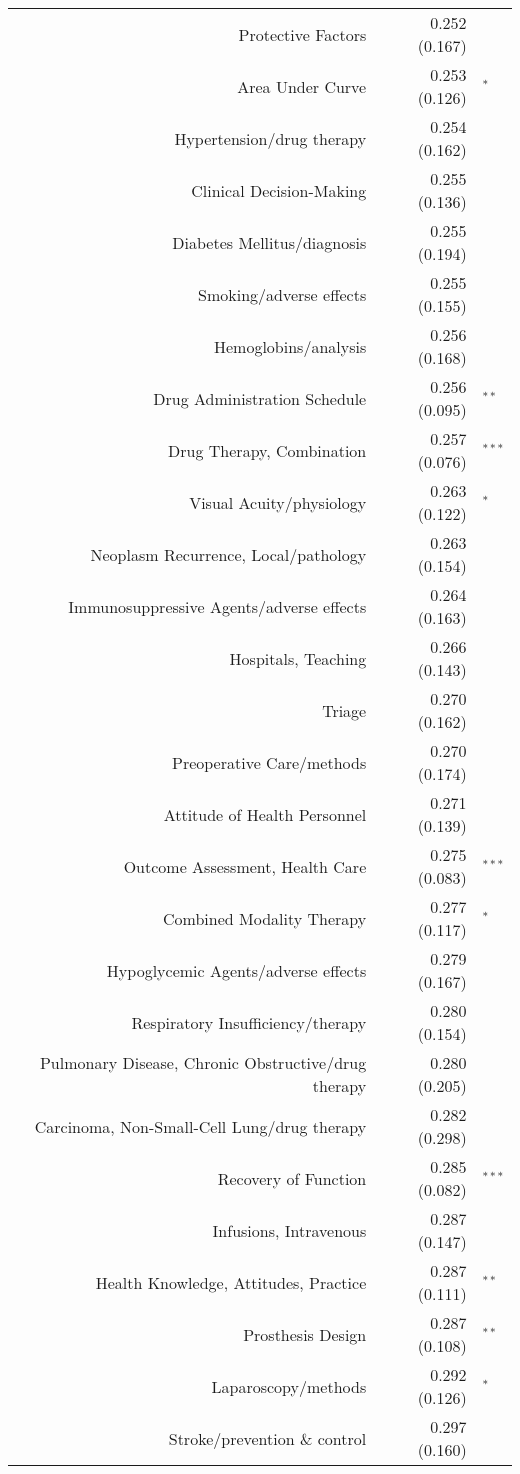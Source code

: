 \begin{longtable}[l]{rr@{}l@{ }}
Protective Factors & 0.252 (0.167) & $^{}$\\
Area Under Curve & 0.253 (0.126) & $^{*}$\\
Hypertension/drug therapy & 0.254 (0.162) & $^{}$\\
Clinical Decision-Making & 0.255 (0.136) & $^{}$\\
Diabetes Mellitus/diagnosis & 0.255 (0.194) & $^{}$\\
Smoking/adverse effects & 0.255 (0.155) & $^{}$\\
Hemoglobins/analysis & 0.256 (0.168) & $^{}$\\
Drug Administration Schedule & 0.256 (0.095) & $^{**}$\\
Drug Therapy, Combination & 0.257 (0.076) & $^{***}$\\
Visual Acuity/physiology & 0.263 (0.122) & $^{*}$\\
Neoplasm Recurrence, Local/pathology & 0.263 (0.154) & $^{}$\\
Immunosuppressive Agents/adverse effects & 0.264 (0.163) & $^{}$\\
Hospitals, Teaching & 0.266 (0.143) & $^{}$\\
Triage & 0.270 (0.162) & $^{}$\\
Preoperative Care/methods & 0.270 (0.174) & $^{}$\\
Attitude of Health Personnel & 0.271 (0.139) & $^{}$\\
Outcome Assessment, Health Care & 0.275 (0.083) & $^{***}$\\
Combined Modality Therapy & 0.277 (0.117) & $^{*}$\\
Hypoglycemic Agents/adverse effects & 0.279 (0.167) & $^{}$\\
Respiratory Insufficiency/therapy & 0.280 (0.154) & $^{}$\\
Pulmonary Disease, Chronic Obstructive/drug therapy & 0.280 (0.205) & $^{}$\\
Carcinoma, Non-Small-Cell Lung/drug therapy & 0.282 (0.298) & $^{}$\\
Recovery of Function & 0.285 (0.082) & $^{***}$\\
Infusions, Intravenous & 0.287 (0.147) & $^{}$\\
Health Knowledge, Attitudes, Practice & 0.287 (0.111) & $^{**}$\\
Prosthesis Design & 0.287 (0.108) & $^{**}$\\
Laparoscopy/methods & 0.292 (0.126) & $^{*}$\\
Stroke/prevention \& control & 0.297 (0.160) & $^{}$\\

\end{longtable}
